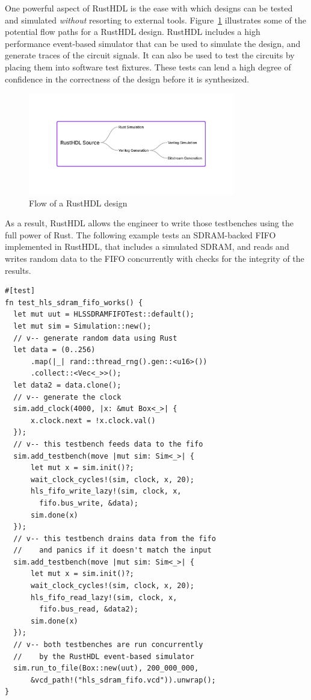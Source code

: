 \documentclass[conference]{IEEEtran}
\begin{document}
One powerful aspect of RustHDL is the ease with which designs can be tested and simulated \emph{without} 
resorting to external tools.  Figure~\ref{fig:flow} illustrates some of the potential flow paths for a 
RustHDL design.  RustHDL includes a high
performance event-based simulator that can be used to simulate the design, and generate traces of the circuit
signals.  It can also be used to test the circuits by placing them into software test fixtures. 
These tests can lend a high degree of confidence in the correctness of the design before it is synthesized.

\begin{figure}[htbp]
  \centerline{\includegraphics[width=9cm]{flow.png}}
  \caption{Flow of a RustHDL design}
  \label{fig:flow}
\end{figure}


As a result, RustHDL allows the engineer to write those testbenches using 
the full power of Rust.  The following example tests an SDRAM-backed FIFO implemented in RustHDL, that
includes a simulated SDRAM, and reads and writes random data to the FIFO concurrently with checks for
the integrity of the results.

\begin{verbatim}
#[test]
fn test_hls_sdram_fifo_works() {
  let mut uut = HLSSDRAMFIFOTest::default();
  let mut sim = Simulation::new();
  // v-- generate random data using Rust
  let data = (0..256)
      .map(|_| rand::thread_rng().gen::<u16>())
      .collect::<Vec<_>>();
  let data2 = data.clone();
  // v-- generate the clock
  sim.add_clock(4000, |x: &mut Box<_>| {
      x.clock.next = !x.clock.val()
  });
  // v-- this testbench feeds data to the fifo
  sim.add_testbench(move |mut sim: Sim<_>| {
      let mut x = sim.init()?;
      wait_clock_cycles!(sim, clock, x, 20);
      hls_fifo_write_lazy!(sim, clock, x, 
        fifo.bus_write, &data);
      sim.done(x)
  });
  // v-- this testbench drains data from the fifo
  //    and panics if it doesn't match the input
  sim.add_testbench(move |mut sim: Sim<_>| {
      let mut x = sim.init()?;
      wait_clock_cycles!(sim, clock, x, 20);
      hls_fifo_read_lazy!(sim, clock, x, 
        fifo.bus_read, &data2);
      sim.done(x)
  });
  // v-- both testbenches are run concurrently
  //    by the RustHDL event-based simulator
  sim.run_to_file(Box::new(uut), 200_000_000, 
      &vcd_path!("hls_sdram_fifo.vcd")).unwrap();
}
\end{verbatim}
\end{document}

